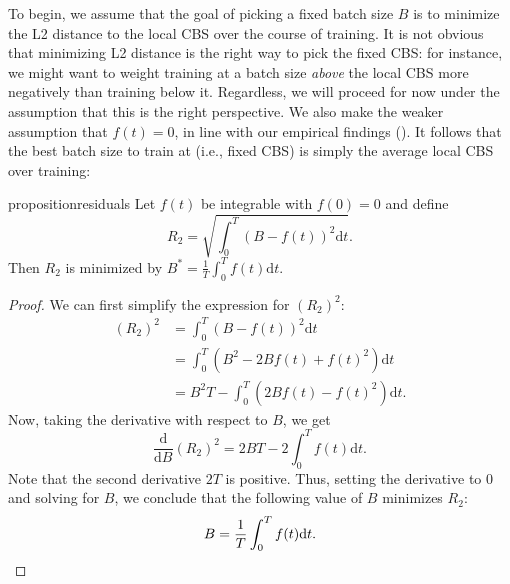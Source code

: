 To begin, we assume that the goal of picking a fixed batch size $B$ is to minimize the L2 distance to the local CBS over the course of training.
It is not obvious that minimizing L2 distance is the right way to pick the fixed CBS: for instance, we might want to weight training at a batch size \emph{above} the local CBS more negatively than training below it.
Regardless, we will proceed for now under the assumption that this is the right perspective.
We also make the weaker assumption that $f(t) = 0$, in line with our empirical findings ().
It follows that the best batch size to train at (i.e., fixed CBS) is simply the average local CBS over training:

\begin{restatable}{proposition}{residuals} \label{thm:residuals}
    Let $f(t)$ be integrable with $f(0) = 0$ and define
    \begin{equation*}
        R_2 = \sqrt{\int_0^T \left( B - f(t) \right)^2 \mathrm{d}t} .
    \end{equation*}
    Then $R_2$ is minimized by $B^* = \frac{1}{T} \int_0^T f(t) \mathrm{d} t$.
\end{restatable}

\begin{proof}
    We can first simplify the expression for $(R_2)^2$:
    \begin{align*}
        (R_2)^2
        &= \int_0^T \left( B - f(t) \right)^2 \mathrm{d}t \\
        &= \int_0^T \left( B^2 - 2Bf(t) + f(t)^2 \right) \mathrm{d}t \\
        &= B^2T - \int_0^T \left( 2Bf(t) - f(t)^2 \right) \mathrm{d}t .
    \end{align*}
    Now, taking the derivative with respect to $B$, we get
    \begin{equation*}
        \frac{\mathrm{d}}{\mathrm{d}B} (R_2)^2
        = 2BT - 2\int_0^T f(t) \mathrm{d} t .
    \end{equation*}
    Note that the second derivative $2T$ is positive.
    Thus, setting the derivative to $0$ and solving for $B$, we conclude that the following value of $B$ minimizes $R_2$:
    \begin{equation*}
        B = \frac{1}{T} \int_0^T f(t) \mathrm{d} t . \qedhere
    \end{equation*}
\end{proof}



